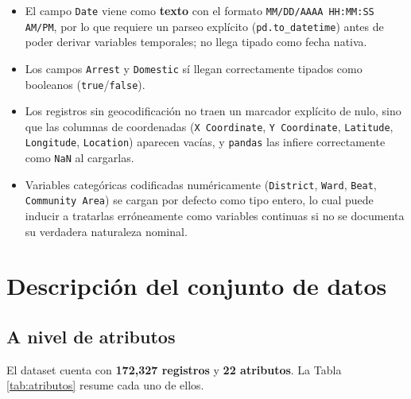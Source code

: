 \documentclass[11pt,a4paper]{article}
\begin{document}
\begin{itemize}
    \item El campo \texttt{Date} viene como \textbf{texto} con el formato
    \texttt{MM/DD/AAAA HH:MM:SS AM/PM}, por lo que requiere un parseo
    explícito (\texttt{pd.to\_datetime}) antes de poder derivar variables
    temporales; no llega tipado como fecha nativa.
    \item Los campos \texttt{Arrest} y \texttt{Domestic} sí llegan
    correctamente tipados como booleanos (\texttt{true}/\texttt{false}).
    \item Los registros sin geocodificación no traen un marcador explícito de
    nulo, sino que las columnas de coordenadas (\texttt{X Coordinate},
    \texttt{Y Coordinate}, \texttt{Latitude}, \texttt{Longitude},
    \texttt{Location}) aparecen vacías, y \texttt{pandas} las infiere
    correctamente como \texttt{NaN} al cargarlas.
    \item Variables categóricas codificadas numéricamente
    (\texttt{District}, \texttt{Ward}, \texttt{Beat},
    \texttt{Community Area}) se cargan por defecto como tipo entero, lo cual
    puede inducir a tratarlas erróneamente como variables continuas si no se
    documenta su verdadera naturaleza nominal.
\end{itemize}

\section{Descripción del conjunto de datos}

\subsection{A nivel de atributos}

El dataset cuenta con \textbf{172,327 registros} y \textbf{22 atributos}. La
Tabla \ref{tab:atributos} resume cada uno de ellos.
\end{document}
